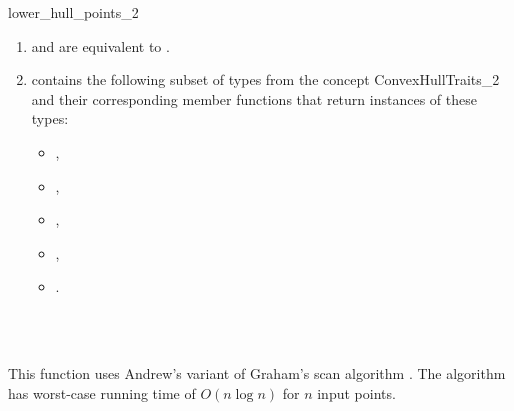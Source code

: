 \begin{ccRefFunction}{lower_hull_points_2}
\begin{enumerate}
   \item    {} and 
            are equivalent to .
   \item    {} contains the following subset of types from
            the concept ConvexHullTraits\_2 and their corresponding member
            functions that return instances of these types:
            \begin{itemize}
                \item {},
                \item {}, 
                \item {},
                \item {}, 
                \item {}.
            \end{itemize}
\end{enumerate}


\ccSeeAlso

 \\
 \\

\ccImplementation

This function uses Andrew's variant of Graham's scan algorithm 
\cite{a-aeach-79,m-mdscg-84}.  The algorithm has worst-case running time 
of $O(n \log n)$ for $n$ input points.

\end{ccRefFunction}


